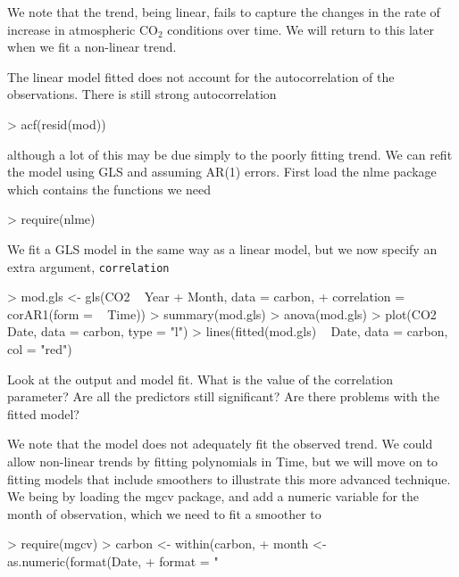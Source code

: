 \documentclass[a4paper,10pt]{article}
\begin{document}
We note that the trend, being linear, fails to capture the changes in the rate of increase in atmospheric $\mathrm{CO_2}$ conditions over time. We will return to this later when we fit a non-linear trend.

The linear model fitted does not account for the autocorrelation of the observations. There is still strong autocorrelation
\begin{Schunk}
\begin{Sinput}
> acf(resid(mod))
\end{Sinput}
\end{Schunk}
although a lot of this may be due simply to the poorly fitting trend. We can refit the model using GLS and assuming AR(1) errors. First load the \textsf{nlme} package which contains the functions we need
\begin{Schunk}
\begin{Sinput}
> require(nlme)
\end{Sinput}
\end{Schunk}
We fit a GLS model in the same way as a linear model, but we now specify an extra argument, \texttt{correlation}
\begin{Schunk}
\begin{Sinput}
> mod.gls <- gls(CO2 ~ Year + Month, data = carbon,
+                correlation = corAR1(form = ~ Time))
> summary(mod.gls)
> anova(mod.gls)
> plot(CO2 ~ Date, data = carbon, type = "l")
> lines(fitted(mod.gls) ~ Date, data = carbon, col = "red")
\end{Sinput}
\end{Schunk}
Look at the output and model fit. What is the value of the correlation parameter? Are all the predictors still significant? Are there problems with the fitted model?

We note that the model does not adequately fit the observed trend. We could allow non-linear trends by fitting polynomials in Time, but we will move on to fitting models that include smoothers to illustrate this more advanced technique. We being by loading the \textsf{mgcv} package, and add a numeric variable for the month of observation, which we need to fit a smoother to
\begin{Schunk}
\begin{Sinput}
> require(mgcv)
> carbon <- within(carbon,
+                  month <- as.numeric(format(Date,
+                                             format = "%m")))
\end{Sinput}
\end{Schunk}
\end{document}
